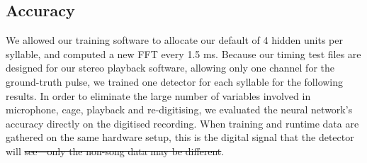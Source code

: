 \documentclass[10pt,letterpaper]{article}
\let\oldmarginpar\marginpar
\renewcommand{\marginpar}[1]{\oldmarginpar{\linespread{1}\scriptsize{#1}}}
\providecommand{\DIFaddtex}[1]{{\protect\color{blue}\uwave{#1}}} %
\providecommand{\DIFdeltex}[1]{{\protect\color{red}\sout{#1}}}                      %
\providecommand{\DIFaddbegin}{} %
\providecommand{\DIFaddend}{} %
\providecommand{\DIFdelbegin}{} %
\providecommand{\DIFdelend}{} %
\providecommand{\DIFadd}[1]{\texorpdfstring{\DIFaddtex{#1}}{#1}} %
\providecommand{\DIFdel}[1]{\texorpdfstring{\DIFdeltex{#1}}{}} %
\newcommand{\DIFscaledelfig}{0.5}
\newlength{\DIFdelgraphicswidth} %
\newlength{\DIFdelgraphicsheight} %
\newcommand{\DIFaddincludegraphics}[2][]{{\color{blue}\fbox{\DIFOincludegraphics[#1]{#2}}}} %
\newcommand{\DIFdelincludegraphics}[2][]{%
\sbox{\DIFdelgraphicsbox}{\DIFOincludegraphics[#1]{#2}}%
\settoboxwidth{\DIFdelgraphicswidth}{\DIFdelgraphicsbox} %
\settoboxtotalheight{\DIFdelgraphicsheight}{\DIFdelgraphicsbox} %
\scalebox{\DIFscaledelfig}{%
\parbox[b]{\DIFdelgraphicswidth}{\usebox{\DIFdelgraphicsbox}\\[-\baselineskip] \rule{\DIFdelgraphicswidth}{0em}}\llap{\resizebox{\DIFdelgraphicswidth}{\DIFdelgraphicsheight}{%
\setlength{\unitlength}{\DIFdelgraphicswidth}%
\begin{picture}(1,1)%
\thicklines\linethickness{2pt} %
{\color[rgb]{1,0,0}\put(0,0){\framebox(1,1){}}}%
{\color[rgb]{1,0,0}\put(0,0){\line( 1,1){1}}}%
{\color[rgb]{1,0,0}\put(0,1){\line(1,-1){1}}}%
\end{picture}%
}\hspace*{3pt}}} %
} %
\DeclareRobustCommand{\DIFaddbegin}{\DIFOaddbegin \let\includegraphics\DIFaddincludegraphics} %
\DeclareRobustCommand{\DIFaddend}{\DIFOaddend \let\includegraphics\DIFOincludegraphics} %
\DeclareRobustCommand{\DIFdelbegin}{\DIFOdelbegin \let\includegraphics\DIFdelincludegraphics} %
\DeclareRobustCommand{\DIFdelend}{\DIFOaddend \let\includegraphics\DIFOincludegraphics} %
\begin{document}
\subsection{Accuracy}


We allowed our training software to allocate our default of 4 hidden
units per syllable, and computed a new FFT every 1.5 ms.  Because our
timing test files are designed for our stereo playback software,
allowing only one channel for the ground-truth pulse, we trained one
detector for each syllable for the following results.  In order to
eliminate the large number of variables involved in microphone, cage,
playback and re-digitising, we evaluated the neural network's accuracy
directly on the digitised recording.  When training and runtime data
are gathered on the same hardware setup, this is the digital signal
that the detector will \DIFdelbegin \DIFdel{see---only the non-song data may be different}\DIFdelend \DIFaddbegin \DIFadd{see}\DIFaddend .
\end{document}
